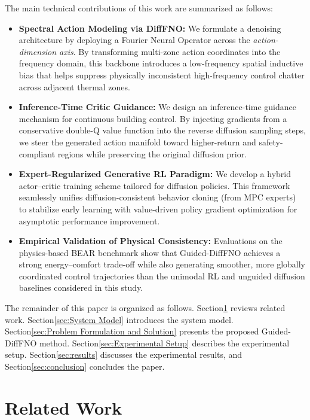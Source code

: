 \documentclass[lettersize,journal]{IEEEtran}
\theoremstyle{nonumberplain}     \theoremheaderfont{\bfseries\itshape}     \theorembodyfont{\normalfont}     \theoremseparator{:}     \theoremsymbol{\ensuremath{\blacksquare}}     \newtheorem{proof}{Proof}
\theoremstyle{plain}     \theoremheaderfont{\bfseries\itshape}     \theorembodyfont{\normalfont}     \theoremseparator{:}     \theoremsymbol{\ensuremath{\blacksquare}}     \newtheorem{remark}{Remark}
\begin{document}
The main technical contributions of this work are summarized as follows:
\begin{itemize}
    \item \textbf{Spectral Action Modeling via DiffFNO:} We formulate a denoising architecture by deploying a Fourier Neural Operator across the \emph{action-dimension axis}. By transforming multi-zone action coordinates into the frequency domain, this backbone introduces a low-frequency spatial inductive bias that helps suppress physically inconsistent high-frequency control chatter across adjacent thermal zones.
    \item \textbf{Inference-Time Critic Guidance:} We design an inference-time guidance mechanism for continuous building control. By injecting gradients from a conservative double-Q value function into the reverse diffusion sampling steps, we steer the generated action manifold toward higher-return and safety-compliant regions while preserving the original diffusion prior.
    \item \textbf{Expert-Regularized Generative RL Paradigm:} We develop a hybrid actor--critic training scheme tailored for diffusion policies. This framework seamlessly unifies diffusion-consistent behavior cloning (from MPC experts) to stabilize early learning with value-driven policy gradient optimization for asymptotic performance improvement.
    \item \textbf{Empirical Validation of Physical Consistency:} Evaluations on the physics-based BEAR benchmark show that Guided-DiffFNO achieves a strong energy--comfort trade-off while also generating smoother, more globally coordinated control trajectories than the unimodal RL and unguided diffusion baselines considered in this study.
\end{itemize}

The remainder of this paper is organized as follows. Section\ref{sec:Related Work} reviews related work. Section\ref{sec:System Model} introduces the system model. Section\ref{sec:Problem Formulation and Solution} presents the proposed Guided-DiffFNO method. Section\ref{sec:Experimental Setup} describes the experimental setup. Section\ref{sec:results} discusses the experimental results, and Section\ref{sec:conclusion} concludes the paper.


\section{Related Work}\label{sec:Related Work}
\end{document}
